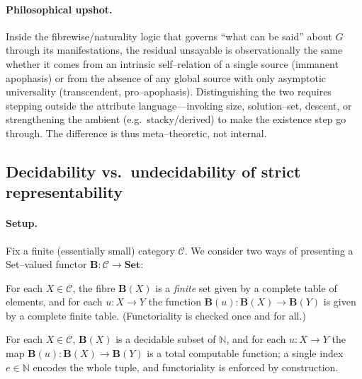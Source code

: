 \documentclass[11pt]{article}
\theoremstyle{upright}
\begin{document}
\paragraph{Philosophical upshot.}
Inside the fibrewise/naturality logic that governs “what can be said” about $G$ through its manifestations, the residual unsayable is observationally the same whether it comes from an intrinsic self–relation of a single source (immanent apophasis) or from the absence of any global source with only asymptotic universality (transcendent, pro–apophasis). Distinguishing the two requires stepping outside the attribute language—invoking size, solution–set, descent, or strengthening the ambient (e.g.\ stacky/derived) to make the existence step go through. The difference is thus meta–theoretic, not internal.

\subsection{Decidability vs.\ undecidability of strict representability}
\paragraph{Setup.}
Fix a finite (essentially small) category $\mathcal C$. We consider two ways of presenting a Set–valued functor $\mathbf B:\mathcal C\to\mathbf{Set}$:

\begin{description}[leftmargin=2em]
\item[(Finitary, extensional input)]
For each $X\in\mathcal C$, the fibre $\mathbf B(X)$ is a \emph{finite} set given by a complete table of elements, and for each $u:X\to Y$ the function $\mathbf B(u):\mathbf B(X)\to\mathbf B(Y)$ is given by a complete finite table. (Functoriality is checked once and for all.)

\item[(Effective, infinitary input)]
For each $X\in\mathcal C$, $\mathbf B(X)$ is a decidable subset of $\mathbb N$, and for each $u:X\to Y$ the map $\mathbf B(u):\mathbf B(X)\to\mathbf B(Y)$ is a total computable function; a single index $e\in\mathbb N$ encodes the whole tuple, and functoriality is enforced by construction.
\end{description}
\end{document}
